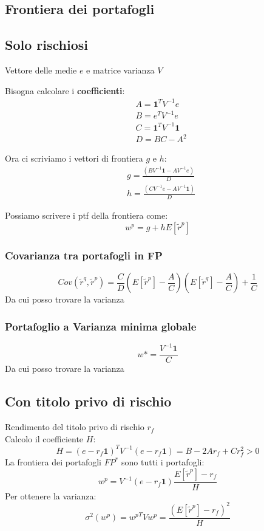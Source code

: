 \documentclass[a4paper,notitlepage]{report}%
\begin{document}
\begin{multicols*}{2}
\section*{Frontiera dei portafogli}

    \subsection*{Solo rischiosi}
        Vettore delle medie $e$ e matrice varianza $V$

        Bisogna calcolare i \textbf{coefficienti}:
        \begin{align*}
            & A = \mathbf{1}^T V^{-1} e \\
            & B = e^T V^{-1} e \\
            & C = \mathbf{1}^T V^{-1} \mathbf{1} \\
            & D = BC-A^2
        \end{align*}

        Ora ci scriviamo i vettori di frontiera $g$ e $h$:
        \begin{align*}
            & g = \frac{(BV^{-1}\mathbf{1} - AV^{-1}e)}{D} \\
            & h = \frac{(CV^{-1}e - AV^{-1}\mathbf{1})}{D}
        \end{align*}

        Possiamo scrivere i ptf della frontiera come:
        \[
            w^p = g+hE[\tilde{r}^p]   
        \]
    
    \subsubsection*{Covarianza tra portafogli in FP}
    \[
        Cov(\tilde{r}^q, \tilde{r}^p ) = \frac{C}{D} \left(E[\tilde{r}^p]-\frac{A}{C}\right) \left(E[\tilde{r}^q]-\frac{A}{C}\right) + \frac{1}{C}
    \]
    Da cui posso trovare la varianza

    \subsubsection*{Portafoglio a Varianza minima globale}
    \[
        w*=\frac{V^{-1}\mathbf{1}}{C}
    \]
    Da cui posso trovare la varianza

    \subsection*{Con titolo privo di rischio}
        Rendimento del titolo privo di rischio $r_f$\\
        Calcolo il coefficiente $H$:
        \[
            H = (e-r_f\mathbf{1})^T V^{-1} (e-r_f\mathbf{1}) = B-2Ar_f+Cr_f^2>0
        \]
        La frontiera dei portafogli $FP^*$ sono tutti i portafogli:
        \[
            w^p = V^{-1} (e-r_f\mathbf{1}) \frac{E[\tilde{r}^p]-r_f}{H}
        \]
        Per ottenere la varianza:
        \[
            \sigma^2(w^p) = { w^p}^T V w^p = \frac{(E[\tilde{r}^p]-r_f)^2}{H}
        \]


\end{multicols*}
\end{document}
